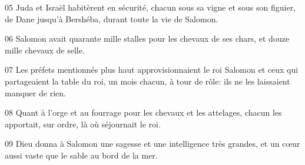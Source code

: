 
05 Juda et Israël habitèrent en sécurité, chacun sous sa vigne et sous son figuier, de Dane jusqu’à Bershéba, durant toute la vie de Salomon.

06 Salomon avait quarante mille stalles pour les chevaux de ses chars, et douze mille chevaux de selle.

07 Les préfets mentionnés plus haut approvisionnaient le roi Salomon et ceux qui partageaient la table du roi, un mois chacun, à tour de rôle: ils ne les laissaient manquer de rien.

08 Quant à l’orge et au fourrage pour les chevaux et les attelages, chacun les apportait, sur ordre, là où séjournait le roi.

09 Dieu donna à Salomon une sagesse et une intelligence très grandes, et un cœur aussi vaste que le sable au bord de la mer.
